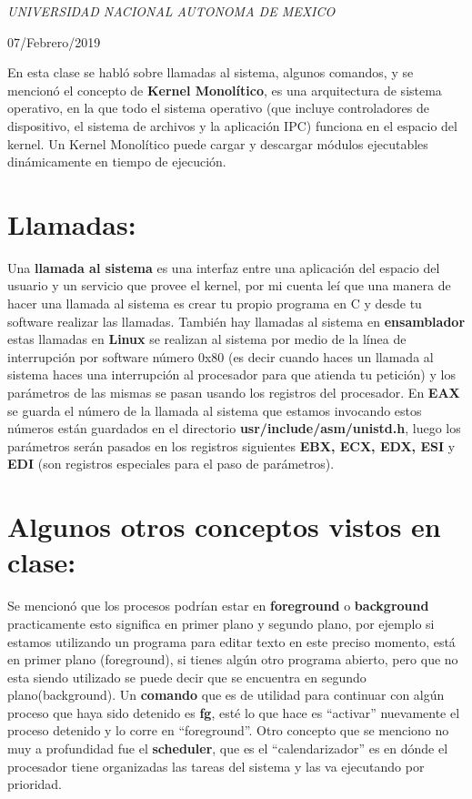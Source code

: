 \documentclass[a4paper, 11pt, oneside]{article}
\begin{document}
\begin{titlepage}
	\textit{UNIVERSIDAD NACIONAL AUTONOMA DE MEXICO} 
	
	\vfill
	
	
	
	
	\vspace{0.3\baselineskip} 
	
	07/Febrero/2019 
	
	 

\end{titlepage}
En esta clase se habló sobre llamadas al sistema, algunos comandos, y se mencionó el concepto de \textbf{Kernel Monolítico}, es una arquitectura de sistema operativo, en la que todo el sistema operativo (que incluye controladores de dispositivo, el sistema de archivos y la aplicación IPC) funciona en el espacio del kernel. Un Kernel Monolítico puede cargar y descargar módulos ejecutables dinámicamente en tiempo de ejecución.
\section*{Llamadas:}
Una \textbf{llamada al sistema} es una interfaz entre una aplicación del espacio del usuario y un servicio que provee el kernel, por mi cuenta leí que una manera de hacer una llamada al sistema es crear tu propio programa en C y desde tu software realizar las llamadas. También hay llamadas al sistema en \textbf{ensamblador} estas llamadas en \textbf{Linux} se realizan al sistema por medio de la línea de interrupción por software número 0x80 (es decir cuando haces un llamada al sistema haces una interrupción al procesador para que atienda tu petición) y los parámetros de las mismas se pasan usando los registros del procesador. En \textbf{EAX} se guarda el número de la llamada al sistema que estamos invocando estos números están guardados en el directorio \textbf{usr/include/asm/unistd.h}, luego los parámetros serán pasados en los registros siguientes \textbf{EBX, ECX, EDX, ESI} y \textbf{EDI} (son registros especiales para el paso de parámetros).

\section*{Algunos otros conceptos vistos en clase:}
Se mencionó que los procesos podrían estar en \textbf{foreground} o \textbf{background} practicamente esto significa en primer plano y segundo plano, por ejemplo si estamos utilizando un programa para editar texto en este preciso momento, está en primer plano (foreground), si tienes algún otro programa abierto, pero que no esta siendo utilizado se puede decir que se encuentra en segundo plano(background). Un \textbf{comando} que es de utilidad para continuar con algún proceso que haya sido detenido es \textbf{fg}, esté lo que hace es ``activar'' nuevamente el proceso detenido y lo corre en ``foreground''. Otro concepto que se menciono no muy a profundidad fue el \textbf{scheduler}, que es el ``calendarizador'' es en dónde el procesador tiene organizadas las tareas del sistema y las va ejecutando por prioridad.
\end{document}
